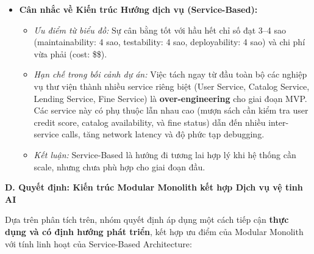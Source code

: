 \begin{itemize}
    \item \textbf{Cân nhắc về Kiến trúc Hướng dịch vụ (Service-Based):} 
    \begin{itemize}
        \item \textit{Ưu điểm từ biểu đồ:} Sự cân bằng tốt với hầu hết chỉ số đạt 3--4 sao (maintainability: 4 sao, testability: 4 sao, deployability: 4 sao) và chi phí vừa phải (cost: \$\$).
        \item \textit{Hạn chế trong bối cảnh dự án:} Việc tách ngay từ đầu toàn bộ các nghiệp vụ thư viện thành nhiều service riêng biệt (User Service, Catalog Service, Lending Service, Fine Service) là \textbf{over-engineering} cho giai đoạn MVP. Các service này có phụ thuộc lẫn nhau cao (mượn sách cần kiểm tra user credit score, catalog availability, và fine status) dẫn đến nhiều inter-service calls, tăng network latency và độ phức tạp debugging.
        \item \textit{Kết luận:} Service-Based là hướng đi tương lai hợp lý khi hệ thống cần scale, nhưng chưa phù hợp cho giai đoạn đầu.
    \end{itemize}
\end{itemize}

\textbf{D. Quyết định: Kiến trúc Modular Monolith kết hợp Dịch vụ vệ tinh AI}

Dựa trên phân tích trên, nhóm quyết định áp dụng một cách tiếp cận \textbf{thực dụng và có định hướng phát triển}, kết hợp ưu điểm của Modular Monolith với tính linh hoạt của Service-Based Architecture:

